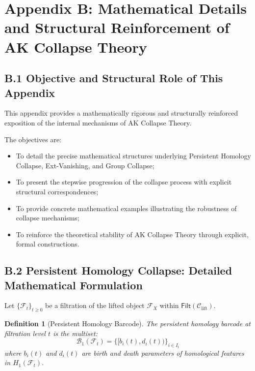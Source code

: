 \documentclass[11pt]{article}
\newtheorem{definition}[theorem]{Definition}
\begin{document}
\FloatBarrier




\section*{Appendix B: Mathematical Details and Structural Reinforcement of AK Collapse Theory}

\subsection*{B.1 Objective and Structural Role of This Appendix}

This appendix provides a mathematically rigorous and structurally reinforced exposition of the internal mechanisms of AK Collapse Theory.

The objectives are:

\begin{itemize}
    \item To detail the precise mathematical structures underlying Persistent Homology Collapse, Ext-Vanishing, and Group Collapse;
    \item To present the stepwise progression of the collapse process with explicit structural correspondences;
    \item To provide concrete mathematical examples illustrating the robustness of collapse mechanisms;
    \item To reinforce the theoretical stability of AK Collapse Theory through explicit, formal constructions.
\end{itemize}

\subsection*{B.2 Persistent Homology Collapse: Detailed Mathematical Formulation}

Let $\{\mathcal{F}_t\}_{t \geq 0}$ be a filtration of the lifted object $\mathcal{F}_X$ within $\mathsf{Filt}(\mathcal{C}_{\mathrm{lift}})$.

\begin{definition}[Persistent Homology Barcode]
The persistent homology barcode at filtration level $t$ is the multiset:
\[
\mathcal{B}_1(\mathcal{F}_t) = \{ [b_i(t), d_i(t)) \}_{i \in I_t}
\]
where $b_i(t)$ and $d_i(t)$ are birth and death parameters of homological features in $H_1(\mathcal{F}_t)$.
\end{definition}
\end{document}
